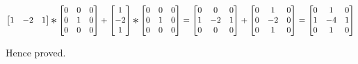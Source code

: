 \documentclass[12pt]{article}
\newcommand{\Conv}{\mathop{\scalebox{1.5}{\raisebox{-0.2ex}{$\ast$}}}}
\begin{document}
\[
\begin{bmatrix}
1 & -2 & 1
\end{bmatrix}
\Conv
\begin{bmatrix}
0 & 0 & 0 \\
0 & 1 & 0 \\
0 & 0 & 0
\end{bmatrix}
+
\begin{bmatrix}
1 \\
-2 \\
1
\end{bmatrix}
\Conv
\begin{bmatrix}
0 & 0 & 0 \\
0 & 1 & 0 \\
0 & 0 & 0
\end{bmatrix}
=
\begin{bmatrix}
0 & 0 & 0 \\
1 & -2 & 1 \\
0 & 0 & 0
\end{bmatrix}
+
\begin{bmatrix}
0 & 1 & 0 \\
0 & -2 & 0 \\
0 & 1 & 0
\end{bmatrix}
=
\begin{bmatrix}
0 & 1 & 0 \\
1 & -4 & 1 \\
0 & 1 & 0
\end{bmatrix}
\]

Hence proved.
\end{document}

